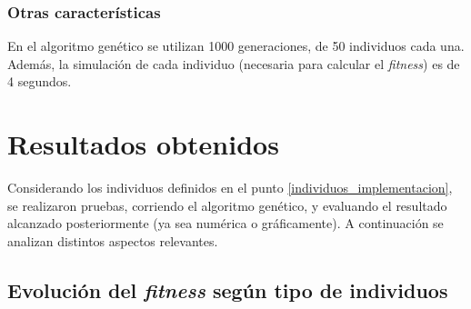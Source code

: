 \documentclass{article}
\begin{document}
\subsubsection{Otras caracter\'isticas}
En el algoritmo gen\'etico se utilizan 1000 generaciones, de 50 individuos cada una. Adem\'as, la simulaci\'on de cada individuo (necesaria para calcular el \textit{fitness}) es de 4 segundos.


\section{Resultados obtenidos}
\label{resultados}
Considerando los individuos definidos en el punto \ref{individuos_implementacion}, se realizaron pruebas, corriendo el algoritmo gen\'etico, y evaluando el resultado alcanzado posteriormente (ya sea num\'erica o gr\'aficamente). A continuaci\'on se analizan distintos aspectos relevantes. 

\subsection{Evoluci\'on del \textit{fitness} seg\'un tipo de individuos}
\end{document}

